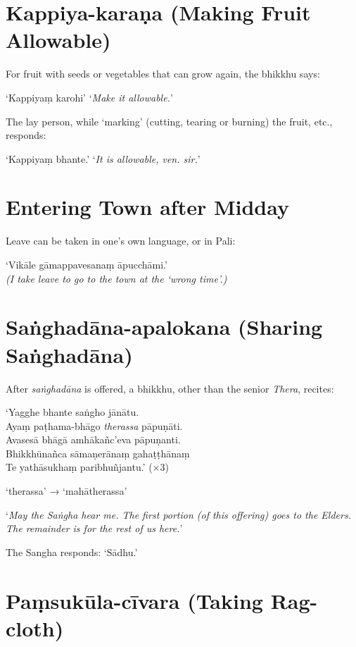 \section{Kappiya-karaṇa (Making Fruit Allowable)}

For fruit with seeds or vegetables that can grow again, the bhikkhu says:

‘Kappiyaṃ karohi’ ‘\emph{Make it allowable.}’

The lay person, while ‘marking’ (cutting, tearing or burning) the fruit, etc., responds:

‘Kappiyaṃ bhante.’ ‘\emph{It is allowable, ven. sir.}’ 

\section{Entering Town after Midday}

Leave can be taken in one's own language, or in Pali:

‘Vikāle gāmappavesanaṃ āpucchāmi.’\\
\emph{(I take leave to go to the town at the ‘wrong time’.)} 

\section{Saṅghadāna-apalokana (Sharing Saṅghadāna)}

After \emph{saṅghadāna} is offered, a bhikkhu, other than the senior
\emph{Thera}, recites:

\vspace*{\parskip}

\begin{paritta}
‘Yagghe bhante saṅgho jānātu.\\
Ayaṃ paṭhama-bhāgo \emph{therassa} pāpuṇāti.\\
Avasesā bhāgā amhākañc’eva pāpuṇanti.\\
Bhikkhūnañca sāmaṇerānaṃ gahaṭṭhānaṃ\\
Te yathāsukhaṃ paribhuñjantu.’ (×3)
\end{paritta}

‘therassa’ → ‘mahātherassa’

‘\emph{May the Saṅgha hear me. The first portion (of this offering) goes to the
  Elders. The remainder is for the rest of us here.}’

The Sangha responds: ‘Sādhu.’ 

\section{Paṃsukūla-cīvara (Taking Rag-cloth)}


